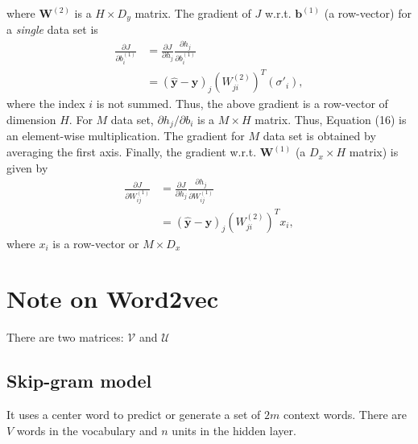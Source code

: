 \documentclass[10pt,letterpaper]{article}
\begin{document}
where $\mathbf{W}^{(2)}$ is a $H \times D_y$ matrix. The gradient of $J$ w.r.t. $\mathbf{b}^{(1)}$ (a row-vector) for a \emph{single} data set is
\begin{align}
\frac{\partial J}{\partial b_i^{(1)}} &= \frac{\partial J}{\partial h_j} \frac{\partial h_j}{\partial  b_i^{(1)}}\\
&= (\hat{\mathbf{y}} - \mathbf{y})_j (W^{(2)}_{ji})^T (\sigma'_i),
\end{align}
where the index $i$ is not summed. Thus, the above gradient is a row-vector of dimension $H$. For $M$ data set, $\partial h_j/\partial b_i$ is a $M \times H$ matrix. Thus, Equation (16) is an element-wise multiplication. The gradient for $M$ data set is obtained by averaging the first axis. Finally, the gradient w.r.t. $\mathbf{W}^{(1)}$ (a $D_x \times H$ matrix) is given by
\begin{align}
\frac{\partial J}{\partial W^{(1)}_{ij}} &= \frac{\partial J}{\partial h_j} \frac{\partial h_j}{\partial  W^{(1)}_{ij}}\\
&= (\hat{\mathbf{y}} - \mathbf{y})_j (W^{(2)}_{ji})^T x_i,
\end{align}
where $x_i$ is a row-vector or $M \times D_x$

\pagebreak
\section{Note on Word2vec}

There are two matrices: $\mathcal{V}$ and  $\mathcal{U}$

\subsection{Skip-gram model}

It uses a center word to predict or generate a set of $2m$ context words. There are $V$ words in the vocabulary and $n$ units in the hidden layer.
\end{document}
